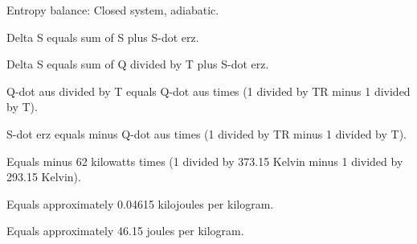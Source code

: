 Entropy balance:  
Closed system, adiabatic.  

Delta S equals sum of S plus S-dot erz.  

Delta S equals sum of Q divided by T plus S-dot erz.  

Q-dot aus divided by T equals Q-dot aus times (1 divided by TR minus 1 divided by T).  

S-dot erz equals minus Q-dot aus times (1 divided by TR minus 1 divided by T).  

Equals minus 62 kilowatts times (1 divided by 373.15 Kelvin minus 1 divided by 293.15 Kelvin).  

Equals approximately 0.04615 kilojoules per kilogram.  

Equals approximately 46.15 joules per kilogram.